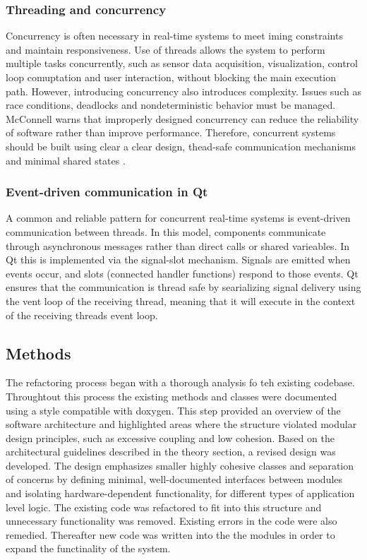 \subsubsection{Threading and concurrency}
Concurrency is often necessary in real-time systems to meet iming constraints and maintain responsiveness. Use of threads allows the system to perform multiple tasks concurrently, such as sensor data acquisition, visualization, control loop comuptation and user interaction, without blocking the main execution path.
\newline \newline
However, introducing concurrency also introduces complexity. Issues such as race conditions, deadlocks and nondeterministic behavior must be managed. McConnell \cite{mcconnell_code_2004} warns that improperly designed concurrency can reduce the reliability of software rather than improve performance. Therefore, concurrent systems should be built using clear a clear design, thead-safe communication mechanisms and minimal shared states \cite{noauthor_software_nodate}.

\subsubsection{Event-driven communication in Qt}
A common and reliable pattern for concurrent real-time systems is event-driven communication between threads. In this model, components communicate through asynchronous messages rather than direct calls or shared varieables. In Qt this is implemented via the signal-slot mechanism. Signals are emitted when events occur, and slots (connected handler functions) respond to those events. Qt ensures that the communication is thread safe by searializing signal delivery using the vent loop of the receiving thread, meaning that it will execute in the context of the receiving threads event loop. 

\subsection{Methods}
The refactoring process began with a thorough analysis fo teh existing codebase. Throughtout this process the existing methods and classes were documented using a style compatible with doxygen. This step provided an overview of the software architecture and highlighted areas where the structure violated modular design principles, such as excessive coupling and low cohesion.
\newline \newline
Based on the architectural guidelines described in the theory section, a revised design was developed. The design emphasizes smaller highly cohesive classes and separation of concerns by defining minimal, well-documented interfaces between modules and isolating hardware-dependent functionality, for different types of application level logic. The existing code was refactored to fit into this structure and unnecessary functionality was removed. Existing errors in the code were also remedied. Thereafter new code was written into the the modules in order to expand the functinality of the system.

